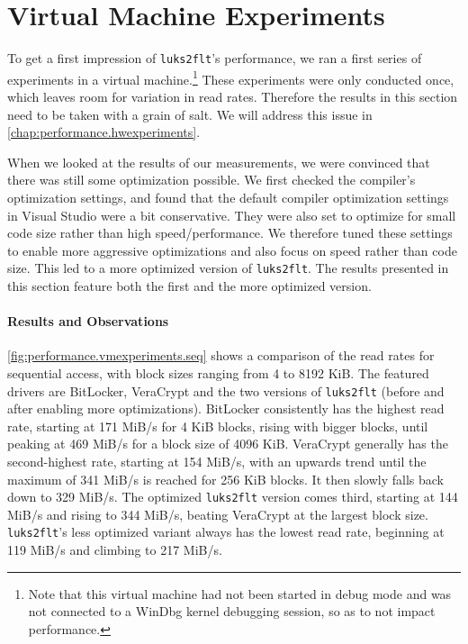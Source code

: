 \section{Virtual Machine Experiments}
\label{chap:performance.vmexperiments}
To get a first impression of \texttt{luks2flt}'s performance, we ran a first series of experiments in a virtual machine.\footnote{\label{fn:performance.vmexperiments.vm} Note that this virtual machine had not been started in debug mode and was not connected to a WinDbg kernel debugging session, so as to not impact performance.} These experiments were only conducted once, which leaves room for variation in read rates. Therefore the results in this section need to be taken with a grain of salt. We will address this issue in \autoref{chap:performance.hwexperiments}.

When we looked at the results of our measurements, we were convinced that there was still some optimization possible. We first checked the compiler's optimization settings, and found that the default compiler optimization settings in Visual Studio were a bit conservative. They were also set to optimize for small code size rather than high speed/performance. We therefore tuned these settings to enable more aggressive optimizations and also focus on speed rather than code size. This led to a more optimized version of \texttt{luks2flt}. The results presented in this section feature both the first and the more optimized version.

\paragraph{Results and Observations}
\autoref{fig:performance.vmexperiments.seq} shows a comparison of the read rates for sequential access, with block sizes ranging from 4 to 8192 KiB. The featured drivers are BitLocker, VeraCrypt and the two versions of \texttt{luks2flt} (before and after enabling more optimizations). BitLocker consistently has the highest read rate, starting at 171 MiB/s for 4 KiB blocks, rising with bigger blocks, until peaking at 469 MiB/s for a block size of 4096 KiB. VeraCrypt generally has the second-highest rate, starting at 154 MiB/s, with an upwards trend until the maximum of 341 MiB/s is reached for 256 KiB blocks. It then slowly falls back down to 329 MiB/s. The optimized \texttt{luks2flt} version comes third, starting at 144 MiB/s and rising to 344 MiB/s, beating VeraCrypt at the largest block size. \texttt{luks2flt}'s less optimized variant always has the lowest read rate, beginning at 119 MiB/s and climbing to 217 MiB/s.

